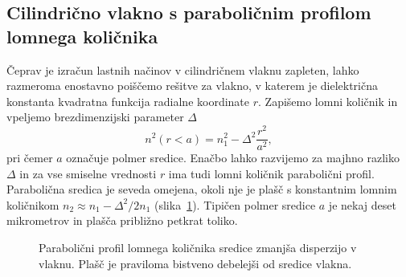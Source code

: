 \subsection*{Cilindrično vlakno s paraboličnim profilom lomnega količnika}
Čeprav je izračun lastnih načinov v cilindričnem vlaknu zapleten, lahko 
razmeroma enostavno poiščemo rešitve za vlakno, v katerem je dielektrična 
konstanta kvadratna funkcija radialne koordinate $r$. 
Zapišemo lomni količnik in vpeljemo brezdimenzijski parameter $\Delta$
\begin{equation}
n^2\left(r<a\right)=n_{1}^{2}- \Delta^2 \frac{r^2}{a^2},
\label{9.15}
\end{equation}
pri čemer $a$ označuje polmer sredice.
Enačbo lahko razvijemo za majhno razliko $\Delta$ in za vse smiselne vrednosti $r$
ima tudi lomni količnik parabolični profil. Parabolična
sredica je seveda omejena, okoli nje je plašč s konstantnim
lomnim količnikom $n_2 \approx n_1-\Delta^2/2n_1$ (slika~\ref{fig:GRIN}). 
Tipičen polmer sredice $a$ je nekaj deset mikrometrov in plašča približno petkrat toliko.
\begin{figure}[ht]
\centering
\def\svgwidth{90truemm} 
 
\caption{Parabolični profil lomnega količnika sredice zmanjša disperzijo v vlaknu. Plašč
 je praviloma bistveno debelejši od sredice vlakna.}
\label{fig:GRIN}
\end{figure}


